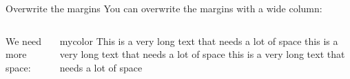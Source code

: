 \documentclass[aspectratio=169,t]{beamer}  %
\begin{document}
\begin{frame}{Overwrite the margins}
  You can overwrite the margins with a wide column:
\begin{columns}
    We need more space:
  \begin{beamercolorbox}[wd=\textwidth, dp=0.7\textheight, colsep*=4pt]{mycolor}
    This is a very long text that needs a lot of space this is a very long text that needs a lot of space this is a very long text that needs a lot of space
  \end{beamercolorbox}
\end{columns}
\end{frame}
\end{document}
